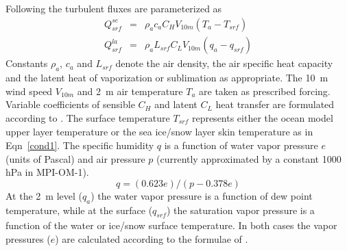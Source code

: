 Following \citet{oberhuber93} the turbulent fluxes are parameterized as
\begin{eqnarray}
%
%
\label{se}  Q_{\mathit{srf}}^{\mathit{se}}             &=&
\rho_{a}c_{a}C_{H}V_{\mathit{10m}}(T_{a} - T_{\mathit{srf}})            \\
%
%
\label{la} Q_{\mathit{srf}}^{\mathit{la}}              &=&
\rho_{a}L_{\mathit{srf}}C_{L}V_{\mathit{10m}}(q_a - q_{\mathit{srf}})
\end{eqnarray}
Constants $\rho_a$, $c_a$ and $L_{\mathit{srf}}$ denote the air density,
the air specific heat capacity and the latent heat of vaporization or sublimation as appropriate.
The 10~m wind speed $V_{\mathit{10m}}$ and 2~m air temperature $T_{a}$ are taken as prescribed forcing.
Variable coefficients of sensible $C_H$ and latent $C_L$ heat transfer 
are formulated according to \citet{large82}.
The surface temperature $T_{\mathit{srf}}$ represents either the ocean model upper layer temperature
or the sea ice/snow layer skin temperature as in Eqn~\ref{cond1}.
The specific humidity $q$ is a function of water vapor pressure $e$ (units of Pascal)
and air pressure $p$ (currently approximated by a constant 1000 hPa in MPI-OM-1).
\begin{equation}
q = (0.623e)/(p-0.378e)
\end{equation}
At the 2~m level ($q_a$) the water vapor pressure is a function of dew point temperature,
while at the surface ($q_{\mathit{srf}}$) the saturation vapor pressure 
is a function of the water or ice/snow surface temperature.
In both cases the vapor pressures ($e$) are calculated according to the formulae of \citet{buck81}.
 
